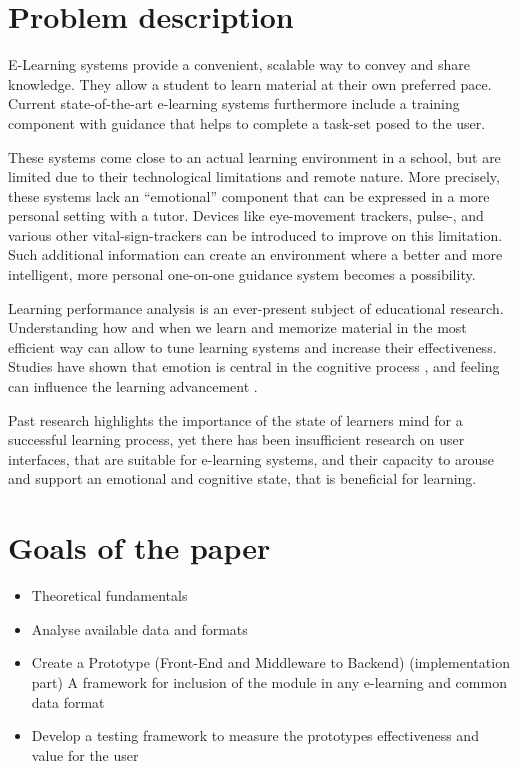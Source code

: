 \section {Problem description}

E-Learning systems provide a convenient, scalable way to convey and share knowledge. They allow a student to learn material at their own preferred pace. 
Current state-of-the-art e-learning systems furthermore include a training component with guidance that helps to complete a task-set posed to the user.

These systems come close to an actual learning environment in a school, but are limited due to their technological limitations and remote nature. More precisely, these systems lack an “emotional” component that can be expressed in a more personal setting with a tutor. Devices like eye-movement trackers, pulse-, and various other vital-sign-trackers can be introduced to improve on this limitation. Such additional information can create an environment where a better and more intelligent, more personal one-on-one guidance system becomes a possibility.

Learning performance analysis is an ever-present subject of educational research. Understanding how and when we learn and memorize material in the most efficient way can allow to tune learning systems and increase their effectiveness. Studies have shown that emotion is central in the cognitive process \cite{ORegan2003}, and feeling can influence the learning advancement \cite{Hawkins2017}.

Past research highlights the importance of the state of learners mind for a successful learning process, yet there has been insufficient research on user interfaces, that are suitable for e-learning systems, and their capacity to arouse and support an emotional and cognitive state, that is beneficial for learning.


\section{Goals of the paper}

\begin{itemize}
	\item Theoretical fundamentals
	\item Analyse available data and formats
	\item Create a Prototype (Front-End and Middleware to Backend) (implementation part)
	\subitem[-] A framework for inclusion of the module in any e-learning and common data format
	\item Develop a testing framework to measure the prototypes effectiveness and value for the user
\end{itemize}

